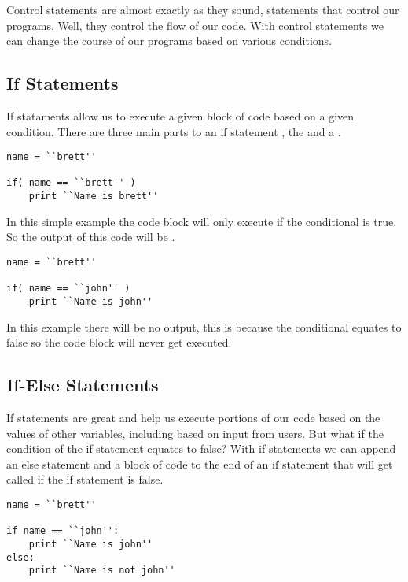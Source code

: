 Control statements are almost exactly as they sound, statements that control our programs.
Well, they control the flow of our code.
With control statements we can change the course of our programs based on various conditions.

\subsection{If Statements}
If stataments allow us to execute a given block of code based on a given condition.
There are three main parts to an if statement , the  and a .


\begin{lstlisting}[caption={If Statement}]
name = ``brett''

if( name == ``brett'' )
    print ``Name is brett''
\end{lstlisting}

In this simple example the code block  will only execute if the conditional  is true.
So the output of this code will be .

\begin{lstlisting}[caption={False If Statement}]
name = ``brett''

if( name == ``john'' )
    print ``Name is john''
\end{lstlisting}

In this example there will be no output, this is because the conditional  equates to false so the code block  will never get executed.

\subsection{If-Else Statements}
If statements are great and help us execute portions of our code based on the values of other variables, including based on input from users.
But what if the condition of the if statement equates to false?
With if statements we can append an else statement and a block of code to the end of an if statement that will get called if the if statement is false. 

\begin{lstlisting}[caption={If-Else Statement}]
name = ``brett''

if name == ``john'':
    print ``Name is john''
else:
    print ``Name is not john''
\end{lstlisting}

